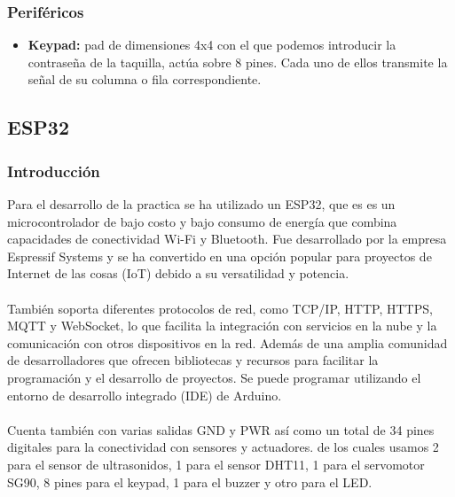 \documentclass[12pt]{report}
\begin{document}
\subsubsection{Periféricos}
\begin{itemize}
    \item \textbf{Keypad:} pad de dimensiones 4x4 con el que podemos introducir la contraseña de la taquilla, actúa sobre 8 pines. Cada uno de ellos transmite la señal de su columna o fila correspondiente.
\end{itemize}
\subsection{ESP32}
\subsubsection{Introducción}
Para el desarrollo de la practica se ha utilizado un ESP32, que es es un microcontrolador de bajo costo y bajo consumo de energía que combina capacidades de conectividad Wi-Fi y Bluetooth. Fue desarrollado por la empresa Espressif Systems y se ha convertido en una opción popular para proyectos de Internet de las cosas (IoT) debido a su versatilidad y potencia. 
\\\\
También soporta diferentes protocolos de red, como TCP/IP, HTTP, HTTPS, MQTT y WebSocket, lo que facilita la integración con servicios en la nube y la comunicación con otros dispositivos en la red. Además de una amplia comunidad de desarrolladores que ofrecen bibliotecas y recursos para facilitar la programación y el desarrollo de proyectos. Se puede programar utilizando el entorno de desarrollo integrado (IDE) de Arduino. 
\\\\
Cuenta también con varias salidas GND y PWR así como un total de 34 pines digitales para la conectividad con sensores y actuadores. de los cuales usamos 2 para el sensor de ultrasonidos, 1 para el sensor DHT11, 1 para el servomotor SG90, 8 pines para el keypad, 1 para el buzzer y otro para el LED.
\end{document}
